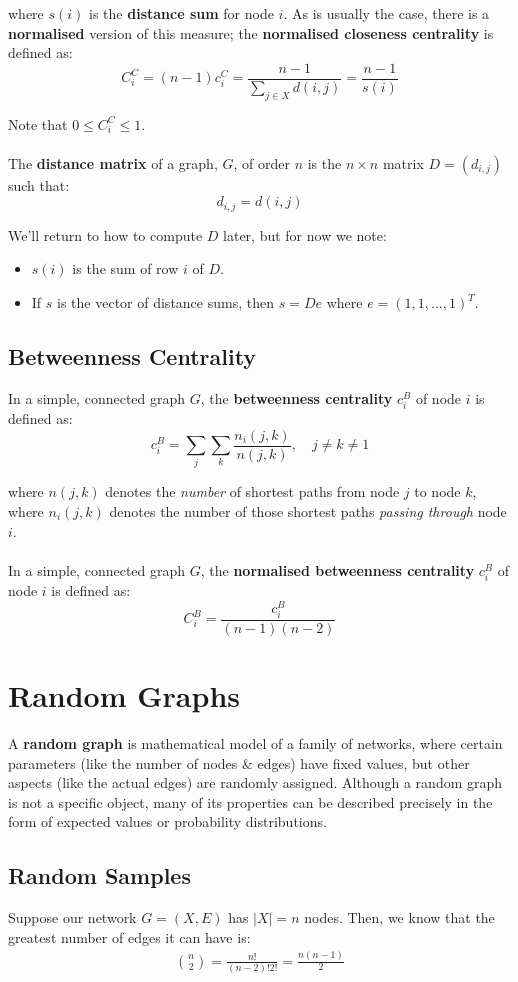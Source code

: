 \documentclass[a4paper,11pt]{article}
\begin{document}
where $s(i)$ is the \textbf{distance sum} for node $i$.
As is usually the case, there is a \textbf{normalised} version of this measure;
the \textbf{normalised closeness centrality} is defined as:
\[
    C_i^C = (n-1)c_i^C = \frac{n-1}{\sum_{j \in X} d(i,j)} = \frac{n-1}{s(i)}
\]

Note that $0 \leq C_i^C \leq 1$.
\\\\
The \textbf{distance matrix} of a graph, $G$, of order $n$ is the $n \times n$ matrix $D=(d_{i,j})$ such that:
\[
    d_{i,j} = d(i,j)
\]

We'll return to how to compute $D$ later, but for now we note:
\begin{itemize}
    \item   $s(i)$ is the sum of row $i$ of $D$.
    \item   If $s$ is the vector of distance sums, then $s = De$ where $e = (1,1, \dots, 1)^T$.
\end{itemize}

\subsection{Betweenness Centrality}
In a simple, connected graph $G$, the \textbf{betweenness centrality} $c_i^B$ of node $i$ is defined as:
\[
    c_i^B = \sum_j \sum_k \frac{n_i(j,k)}{n(j,k)}, \quad j \neq k \neq 1
\]

where $n(j,k)$ denotes the \textit{number} of shortest paths from node $j$ to node $k$, where $n_i(j,k)$ denotes the number of those shortest paths \textit{passing through} node $i$.
\\\\
In a simple, connected graph $G$, the \textbf{normalised betweenness centrality} $c_i^B$ of node $i$ is defined as:
\[
    C_i^B = \frac{c_i^B}{(n-1)(n-2)}
\]

\section{Random Graphs}
A \textbf{random graph} is mathematical model of a family of networks, where certain parameters (like the number of nodes \& edges) have fixed values, but other aspects (like the actual edges) are randomly assigned.
Although a random graph is not a specific object, many of its properties can be described precisely in the form of expected values or probability distributions.

\subsection{Random Samples}
Suppose our network $G = (X,E)$ has $|X| = n$ nodes.
Then, we know that the greatest number of edges it can have is:
\begin{align*}
    \binom{n}{2} = \frac{n!}{(n-2)! 2!} = \frac{n(n-1)}{2}
\end{align*}
\end{document}
